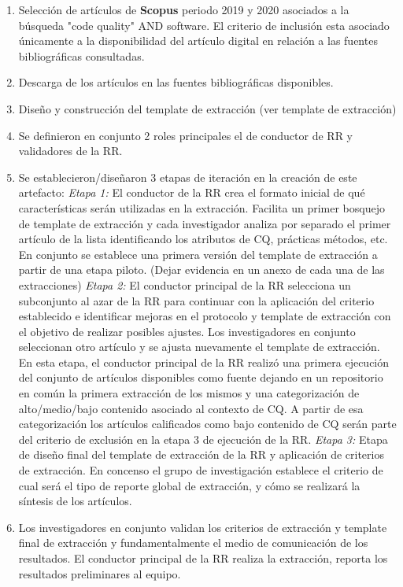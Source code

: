\documentclass[conference]{IEEEtran}
\begin{document}
\begin{enumerate}
\item Selección de artículos de \textbf{Scopus} periodo 2019 y 2020 asociados a la búsqueda "code quality" AND software. El criterio de inclusión esta asociado únicamente a la disponibilidad del artículo digital en relación a las fuentes bibliográficas consultadas.
\item  Descarga de los artículos en las fuentes bibliográficas disponibles. 
\item Diseño y construcción del template  de extracción (ver template de extracción)
\item Se definieron en conjunto 2 roles principales el de conductor de RR y validadores de la RR. 
\item Se establecieron/diseñaron 3 etapas de iteración en la creación de este artefacto: 
    \textit{Etapa 1: } El conductor de la RR crea el formato inicial de qué características serán utilizadas en la extracción. Facilita un primer bosquejo de template de extracción y cada investigador analiza por separado el primer artículo de la lista identificando los atributos de CQ, prácticas métodos, etc.  En conjunto se establece una primera versión del template de extracción a partir de una etapa piloto. (Dejar evidencia en un anexo de cada una de las extracciones)
  \textit{  Etapa 2: } El conductor principal de la RR selecciona un subconjunto al azar de la RR para continuar con la aplicación del criterio establecido e identificar mejoras en el protocolo y template de extracción con el objetivo de  realizar posibles ajustes. Los investigadores en conjunto seleccionan otro artículo y se ajusta nuevamente el template de extracción. En esta etapa, el conductor principal de la RR realizó una primera ejecución del conjunto de artículos disponibles como fuente dejando en un repositorio en común la primera extracción de los mismos y una categorización de alto/medio/bajo  contenido asociado al contexto de CQ. A partir de esa categorización los artículos calificados como bajo contenido de CQ serán parte del criterio de exclusión en la etapa 3 de ejecución de la RR. 
    \textit{Etapa 3:} Etapa de diseño final del template de extracción de la RR y aplicación de criterios de extracción. En concenso el grupo de investigación establece el criterio de cual será el tipo de reporte global de extracción, y cómo se realizará la síntesis de los artículos.
\item Los investigadores en conjunto validan los criterios de extracción y template final de extracción y fundamentalmente el medio de comunicación de los resultados.  El conductor principal de la RR realiza la extracción, reporta los resultados preliminares al equipo. 

\end{enumerate}
\end{document}

